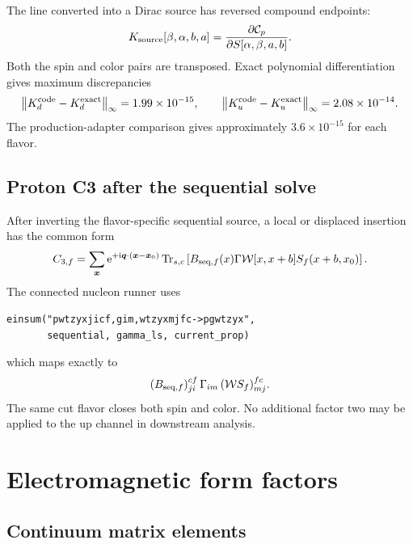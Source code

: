 \documentclass[11pt,a4paper]{article}
\numberwithin{equation}{section}
\newcommand{\ii}{\mathrm{i}}
\newcommand{\ee}{\mathrm{e}}
\newcommand{\Trsc}{\operatorname{Tr}_{s,c}}
\newcommand{\norm}[1]{\left\lVert#1\right\rVert}
\newcommand{\cW}{\mathcal{W}}
\begin{document}
The line converted into a Dirac source has reversed compound endpoints:
\begin{equation}
 K_{\rm source}[\beta,\alpha,b,a]
 =\frac{\partial\mathcal C_p}
        {\partial S[\alpha,\beta,a,b]}.
 \label{eq:kernel-source-transpose}
\end{equation}
Both the spin and color pairs are transposed.  Exact polynomial
differentiation gives maximum discrepancies
\begin{equation}
 \norm{K_d^{\rm code}-K_d^{\rm exact}}_\infty
 =1.99\times10^{-15},\qquad
 \norm{K_u^{\rm code}-K_u^{\rm exact}}_\infty
 =2.08\times10^{-14}.
\end{equation}
The production-adapter comparison gives approximately
\(3.6\times10^{-15}\) for each flavor.

\subsection{Proton C3 after the sequential solve}

After inverting the flavor-specific sequential source, a local or displaced
insertion has the common form
\begin{equation}
 C_{3,f}
 =\sum_{\boldsymbol x}
 \ee^{+\ii\boldsymbol q\cdot(\boldsymbol x-\boldsymbol x_0)}
 \Trsc\left[
 B_{{\rm seq},f}(x)\Gamma
 \cW[x,x+b]S_f(x+b,x_0)
 \right].
 \label{eq:proton-C3-after-seq}
\end{equation}
The connected nucleon runner uses
\begin{lstlisting}
einsum("pwtzyxjicf,gim,wtzyxmjfc->pgwtzyx",
       sequential, gamma_ls, current_prop)
\end{lstlisting}
which maps exactly to
\begin{equation}
 (B_{{\rm seq},f})_{ji}^{cf}\,
 \Gamma_{im}\,
 (\cW S_f)_{mj}^{fc}.
\end{equation}
The same cut flavor closes both spin and color.  No additional factor two
may be applied to the up channel in downstream analysis.

\section{Electromagnetic form factors}

\subsection{Continuum matrix elements}
\end{document}
